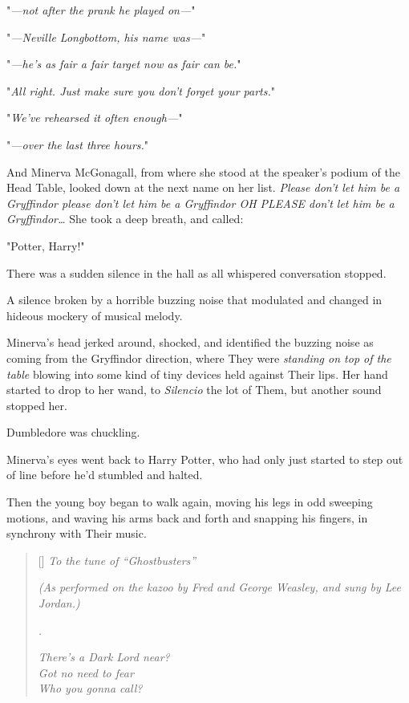 "\emph{---not after the prank he played on---}"

"\emph{---Neville Longbottom, his name was---}"

"\emph{---he's as fair a fair target now as fair can be.}"

"\emph{All right. Just make sure you don't forget your parts.}"

"\emph{We've rehearsed it often enough---}"

"\emph{---over the last three hours.}"

And Minerva McGonagall, from where she stood at the speaker's podium of the 
Head Table, looked down at the next name on her list. \emph{Please don't let 
him be a Gryffindor please don't let him be a Gryffindor OH PLEASE don't let 
him be a Gryffindor{\ldots}} She took a deep breath, and called:

"Potter, Harry!"

There was a sudden silence in the hall as all whispered conversation stopped.

A silence broken by a horrible buzzing noise that modulated and changed in 
hideous mockery of musical melody.

Minerva's head jerked around, shocked, and identified the buzzing noise as 
coming from the Gryffindor direction, where They were \emph{standing on top of 
the table} blowing into some kind of tiny devices held against Their lips. Her 
hand started to drop to her wand, to \emph{Silencio} the lot of Them, but 
another sound stopped her.

Dumbledore was chuckling.

Minerva's eyes went back to Harry Potter, who had only just started to step out 
of line before he'd stumbled and halted.

Then the young boy began to walk again, moving his legs in odd sweeping 
motions, and waving his arms back and forth and snapping his fingers, in 
synchrony with Their music.

\baselineskip\settowidth{\versewidth}{I ain't afraid of Dark Lords!}
\begin{verse}[\versewidth]
\emph{To the tune of ``Ghostbusters''}

\emph{(As performed on the kazoo by Fred and George Weasley,
and sung by Lee Jordan.)}

\emph{.}

\emph{There's a Dark Lord near?\\
Got no need to fear\\
Who you gonna call?}
\end{verse}\baselineskip

